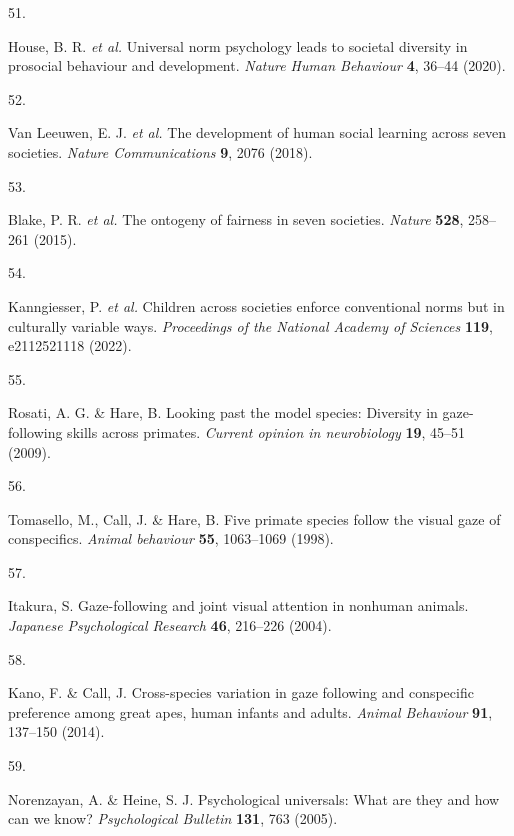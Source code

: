 \documentclass[
  man,floatsintext]{apa6}
\newlength{\cslhangindent}
\newlength{\csllabelwidth}
\newlength{\cslentryspacingunit} %
\newenvironment{CSLReferences}[2] %
 {%
  \setlength{\parindent}{0pt}
  \ifodd #1
  \let\oldpar\par
  \def\par{\hangindent=\cslhangindent\oldpar}
  \fi
  \setlength{\parskip}{#2\cslentryspacingunit}
 }%
 {}
\newcommand{\CSLLeftMargin}[1]{\parbox[t]{\csllabelwidth}{#1}}
\newcommand{\CSLRightInline}[1]{\parbox[t]{\linewidth - \csllabelwidth}{#1}\break}
\begin{document}
\begin{CSLReferences}{0}{0}
\leavevmode{}%
\CSLLeftMargin{51. }%
\CSLRightInline{House, B. R. \emph{et al.} Universal norm psychology leads to societal diversity in prosocial behaviour and development. \emph{Nature Human Behaviour} \textbf{4}, 36--44 (2020).}

\leavevmode{}%
\CSLLeftMargin{52. }%
\CSLRightInline{Van Leeuwen, E. J. \emph{et al.} The development of human social learning across seven societies. \emph{Nature Communications} \textbf{9}, 2076 (2018).}

\leavevmode{}%
\CSLLeftMargin{53. }%
\CSLRightInline{Blake, P. R. \emph{et al.} The ontogeny of fairness in seven societies. \emph{Nature} \textbf{528}, 258--261 (2015).}

\leavevmode{}%
\CSLLeftMargin{54. }%
\CSLRightInline{Kanngiesser, P. \emph{et al.} Children across societies enforce conventional norms but in culturally variable ways. \emph{Proceedings of the National Academy of Sciences} \textbf{119}, e2112521118 (2022).}

\leavevmode{}%
\CSLLeftMargin{55. }%
\CSLRightInline{Rosati, A. G. \& Hare, B. Looking past the model species: Diversity in gaze-following skills across primates. \emph{Current opinion in neurobiology} \textbf{19}, 45--51 (2009).}

\leavevmode{}%
\CSLLeftMargin{56. }%
\CSLRightInline{Tomasello, M., Call, J. \& Hare, B. Five primate species follow the visual gaze of conspecifics. \emph{Animal behaviour} \textbf{55}, 1063--1069 (1998).}

\leavevmode{}%
\CSLLeftMargin{57. }%
\CSLRightInline{Itakura, S. Gaze-following and joint visual attention in nonhuman animals. \emph{Japanese Psychological Research} \textbf{46}, 216--226 (2004).}

\leavevmode{}%
\CSLLeftMargin{58. }%
\CSLRightInline{Kano, F. \& Call, J. Cross-species variation in gaze following and conspecific preference among great apes, human infants and adults. \emph{Animal Behaviour} \textbf{91}, 137--150 (2014).}

\leavevmode{}%
\CSLLeftMargin{59. }%
\CSLRightInline{Norenzayan, A. \& Heine, S. J. Psychological universals: What are they and how can we know? \emph{Psychological Bulletin} \textbf{131}, 763 (2005).}


\end{CSLReferences}
\end{document}
